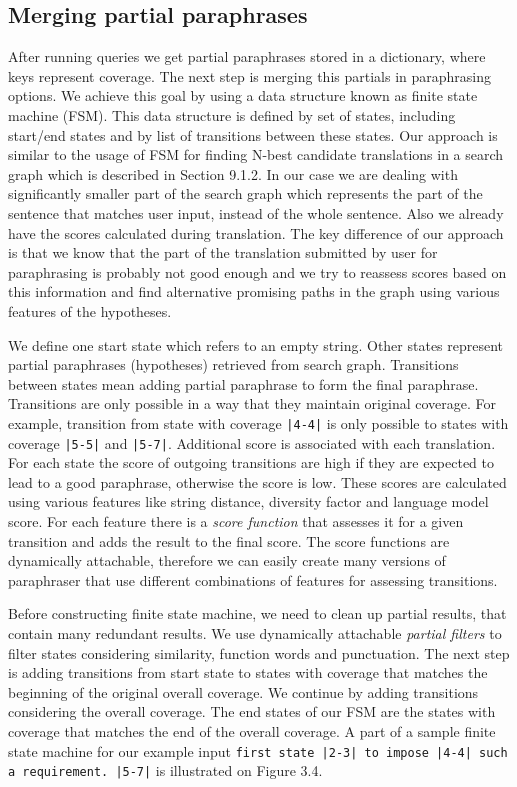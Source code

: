 \subsection{Merging partial paraphrases}

After running queries we get partial paraphrases stored in a dictionary, where keys represent coverage. The next step is merging this partials in paraphrasing options. We achieve this goal by using a data structure known as finite state machine (FSM). This data structure is defined by set of states, including start/end states and by list of transitions between these states. Our approach is similar to the usage of FSM for finding N-best candidate translations in a search graph which is described in \cite{Koehn2009a} Section 9.1.2. In our case we are dealing with significantly smaller part of the search graph which represents the part of the sentence that matches user input, instead of the whole sentence. Also we already have the scores calculated during translation. The key difference of our approach is that we know that the part of the translation submitted by user for paraphrasing is probably not good enough and we try to reassess scores based on this information and find alternative promising paths in the graph using various features of the hypotheses. 

We define one start state which refers to an empty string. Other states represent partial paraphrases (hypotheses) retrieved from search graph. Transitions between states mean adding partial paraphrase to form the final paraphrase. Transitions are only possible in a way that they maintain original coverage. For example, transition from state with coverage \texttt{|4-4|} is only possible to states with coverage \texttt{|5-5|} and \texttt{|5-7|}. Additional score is associated with each translation. For each state the score of outgoing transitions are high if they are expected to lead to a good paraphrase, otherwise the score is low. These scores are calculated using various features like string distance, diversity factor and language model score. For each feature there is a \emph{score function} that assesses it for a given transition and adds the result to the final score. The score functions are dynamically attachable, therefore we can easily create many versions of paraphraser that use different combinations of features for assessing transitions. 

Before constructing finite state machine, we need to clean up partial results, that contain many redundant results. We use dynamically attachable \emph{partial filters} to filter states considering similarity, function words and punctuation. The next step is adding transitions from start state to states with coverage that matches the beginning of the original overall coverage. We continue by adding transitions considering the overall coverage. The end states of our FSM are the states with coverage that matches the end of the overall coverage. A part of a sample finite state machine for our example input \texttt{first state |2-3| to impose |4-4| such a requirement. |5-7|} is illustrated on Figure 3.4.

